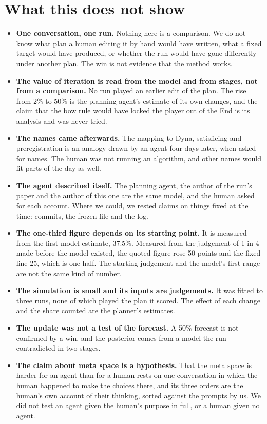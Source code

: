 \documentclass[11pt,a4paper]{article}
\begin{document}
\section{What this does not show}
\label{sec:limits}

\begin{itemize}
\item \textbf{One conversation, one run.} Nothing here is a comparison. We do not know what plan a human editing it by hand would have written, what a fixed target would have produced, or whether the run would have gone differently under another plan. The win is not evidence that the method works.
\item \textbf{The value of iteration is read from the model and from stages, not from a comparison.} No run played an earlier edit of the plan. The rise from 2\% to 50\% is the planning agent's estimate of its own changes, and the claim that the bow rule would have locked the player out of the End is its analysis and was never tried.
\item \textbf{The names came afterwards.} The mapping to Dyna, satisficing and preregistration is an analogy drawn by an agent four days later, when asked for names. The human was not running an algorithm, and other names would fit parts of the day as well.
\item \textbf{The agent described itself.} The planning agent, the author of the run's paper and the author of this one are the same model, and the human asked for each account. Where we could, we rested claims on things fixed at the time: commits, the frozen file and the log.
\item \textbf{The one-third figure depends on its starting point.} It is measured from the first model estimate, 37.5\%. Measured from the judgement of 1 in 4 made before the model existed, the quoted figure rose 50 points and the fixed line 25, which is one half. The starting judgement and the model's first range are not the same kind of number.
\item \textbf{The simulation is small and its inputs are judgements.} It was fitted to three runs, none of which played the plan it scored. The effect of each change and the share counted are the planner's estimates.
\item \textbf{The update was not a test of the forecast.} A 50\% forecast is not confirmed by a win, and the posterior comes from a model the run contradicted in two stages.
\item \textbf{The claim about meta space is a hypothesis.} That the meta space is harder for an agent than for a human rests on one conversation in which the human happened to make the choices there, and its three orders are the human's own account of their thinking, sorted against the prompts by us. We did not test an agent given the human's purpose in full, or a human given no agent.

\end{itemize}
\end{document}
